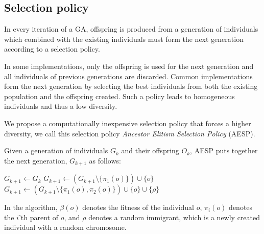 \subsection{Selection policy}
In every iteration of a GA, offspring is produced from a generation of individuals which combined with the existing individuals must form the next generation according to a selection policy.

In some implementations, only the offspring is used for the next generation and all individuals of previous generations are discarded. Common implementations form the next generation by selecting the best individuals from both the existing population and the offspring created\cite{masterthesis}. Such a policy leads to homogeneous individuals and thus a low diversity.

We propose a computationally inexpensive selection policy that forces a higher diversity, we call this selection policy \emph{Ancestor Elitism Selection Policy} (AESP).

Given a generation of individuals $G_k$ and their offspring $O_k$, AESP puts together the next generation, $G_{k+1}$ as follows:

  \begin{algorithmic}[1]
    \State $G_{k+1} \gets G_k$
    		\State $G_{k+1} \gets (G_{k+1} \setminus \{\pi_1(o)\}) \cup \{o\}$
		\EndIf
      \Else
        \State $G_{k+1} \gets (G_{k+1} \setminus \{\pi_1(o), \pi_2(o)\}) \cup 
            \{o\} \cup \{\rho\}$
	    \EndIf
      \EndIf
    \EndFor
  \end{algorithmic}


In the algorithm, $\beta(o)$ denotes the fitness of the individual $o$, $\pi_i(o)$ denotes the $i$'th parent of $o$, and $\rho$ denotes a random immigrant, which is a newly created individual with a random chromosome.



